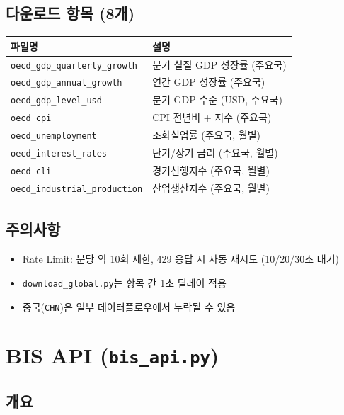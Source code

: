 \documentclass[11pt,a4paper]{article}
\newcommand{\code}[1]{\texttt{#1}}
\newcommand{\file}[1]{\texttt{\textcolor{string}{#1}}}
\begin{document}
\subsection{다운로드 항목 (8개)}

\begin{longtable}{l l}
\toprule
\textbf{파일명} & \textbf{설명} \\
\midrule
\endhead
\file{oecd\_gdp\_quarterly\_growth} & 분기 실질 GDP 성장률 (주요국) \\
\file{oecd\_gdp\_annual\_growth}    & 연간 GDP 성장률 (주요국) \\
\file{oecd\_gdp\_level\_usd}        & 분기 GDP 수준 (USD, 주요국) \\
\file{oecd\_cpi}                    & CPI 전년비 + 지수 (주요국) \\
\file{oecd\_unemployment}           & 조화실업률 (주요국, 월별) \\
\file{oecd\_interest\_rates}        & 단기/장기 금리 (주요국, 월별) \\
\file{oecd\_cli}                    & 경기선행지수 (주요국, 월별) \\
\file{oecd\_industrial\_production} & 산업생산지수 (주요국, 월별) \\
\bottomrule
\end{longtable}

\subsection{주의사항}

\begin{itemize}[leftmargin=2em]
    \item Rate Limit: 분당 약 10회 제한, 429 응답 시 자동 재시도 (10/20/30초 대기)
    \item \code{download\_global.py}는 항목 간 1초 딜레이 적용
    \item 중국(\code{CHN})은 일부 데이터플로우에서 누락될 수 있음
\end{itemize}


\section{BIS API (\file{bis\_api.py})}

\subsection{개요}
\end{document}

